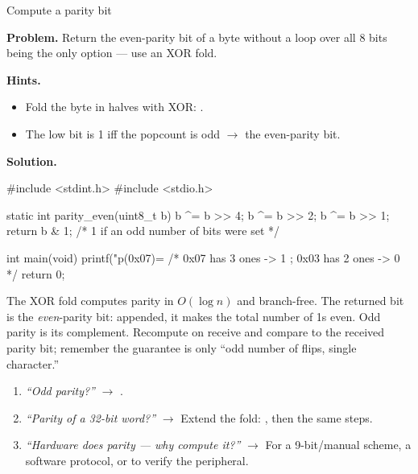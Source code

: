 \begin{gymproblem}{Compute a parity bit}

\textbf{Problem.} Return the even-parity bit of a byte without a loop over all
8 bits being the only option --- use an XOR fold.

\textbf{Hints.}
\begin{itemize}
\item Fold the byte in halves with XOR: .
\item The low bit is 1 iff the popcount is odd $\rightarrow$ the even-parity
  bit.
\end{itemize}

\attempt

\textbf{Solution.}
\begin{cgym}
#include <stdint.h>
#include <stdio.h>

static int parity_even(uint8_t b) {
    b ^= b >> 4;
    b ^= b >> 2;
    b ^= b >> 1;
    return b & 1;          /* 1 if an odd number of bits were set */
}

int main(void) {
    printf("p(0x07)=%
    /* 0x07 has 3 ones -> 1 ; 0x03 has 2 ones -> 0 */
    return 0;
}
\end{cgym}

The XOR fold computes parity in $O(\log n)$ and branch-free. The returned bit is
the \emph{even}-parity bit: appended, it makes the total number of 1s even.
Odd parity is its complement. Recompute on receive and compare to the received
parity bit; remember the guarantee is only ``odd number of flips, single
character.''

\followups
\begin{enumerate}
\item \emph{``Odd parity?''} $\rightarrow$ .
\item \emph{``Parity of a 32-bit word?''} $\rightarrow$ Extend the fold:
  , then the same steps.
\item \emph{``Hardware does parity --- why compute it?''} $\rightarrow$ For a
  9-bit/manual scheme, a software protocol, or to verify the peripheral.
\end{enumerate}
\end{gymproblem}

